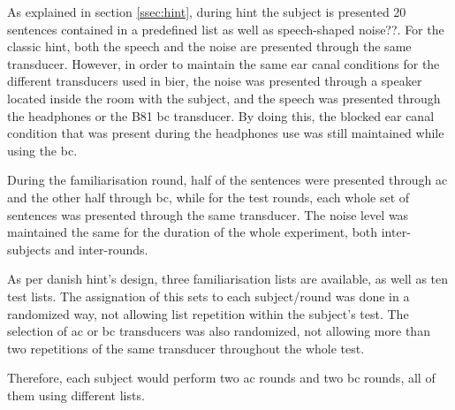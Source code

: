 As explained in section \autoref{ssec:hint}, during \gls{hint} the subject is presented 20 sentences contained in a predefined list as well as speech-shaped noise??. For the classic \gls{hint}, both the speech and the noise are presented through the same transducer. However, in order to maintain the same ear canal conditions for the different transducers used in \gls{bier}, the noise was presented through a speaker located inside the room with the subject, and the speech was presented through the headphones or the B81 \gls{bc} transducer. By doing this, the blocked ear canal condition that was present during the headphones use was still maintained while using the \gls{bc}.

During the familiarisation round, half of the sentences were presented through \gls{ac} and the other half through \gls{bc}, while for the test rounds, each whole set of sentences was presented through the same transducer. The noise level was maintained the same for the duration of the whole experiment, both inter-subjects and inter-rounds.

As per danish \gls{hint}'s design, three familiarisation lists are available, as well as ten test lists. The assignation of this sets to each subject/round was done in a randomized way, not allowing list repetition within the subject's test. The selection of \gls{ac} or \gls{bc} transducers was also randomized, not allowing more than two repetitions of the same transducer throughout the whole test.

Therefore, each subject would perform two \gls{ac} rounds and two \gls{bc} rounds, all of them using different lists.